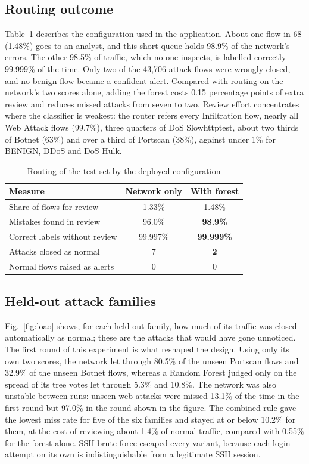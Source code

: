 \documentclass[conference]{IEEEtran}
\begin{document}
\subsection{Routing outcome}
Table~\ref{tab:routing} describes the configuration used in the application. About one flow in 68
(1.48\%) goes to an analyst, and this short queue holds 98.9\% of the network's errors. The other
98.5\% of traffic, which no one inspects, is labelled correctly 99.999\% of the time. Only two of the 43,706
attack flows were wrongly closed, and no benign flow became a confident alert. Compared with
routing on the network's two scores alone, adding the forest costs 0.15 percentage points of extra
review and reduces missed attacks from seven to two. Review effort concentrates where the classifier
is weakest: the router refers every Infiltration flow, nearly all Web Attack flows (99.7\%), three quarters of
DoS Slowhttptest, about two thirds of Botnet (63\%) and over a third of Portscan (38\%), against under 1\% for BENIGN, DDoS and DoS Hulk.

\begin{table}[t]
\caption{Routing of the test set by the deployed configuration}
\label{tab:routing}
\centering
\footnotesize
\begin{tabular}{lcc}
\toprule
Measure & Network only & With forest \\
\midrule
Share of flows for review & 1.33\% & 1.48\% \\
Mistakes found in review & 96.0\% & \textbf{98.9\%} \\
Correct labels without review & 99.997\% & \textbf{99.999\%} \\
Attacks closed as normal & 7 & \textbf{2} \\
Normal flows raised as alerts & 0 & 0 \\
\bottomrule
\end{tabular}
\end{table}

\subsection{Held-out attack families}
\label{sec:loao}
Fig.~\ref{fig:loao} shows, for each held-out family, how much of its traffic was closed automatically as normal;
these are the attacks that would have gone unnoticed. The first round of this experiment
is what reshaped the design. Using only its own two scores, the network let through 80.5\% of the
unseen Portscan flows and 32.9\% of the unseen Botnet flows, whereas a Random Forest judged only on
the spread of its tree votes let through 5.3\% and 10.8\%. The network was also unstable between
runs: unseen web attacks were missed 13.1\% of the time in the first round but 97.0\% in the round
shown in the figure. The combined rule gave the lowest miss rate for five of the six families and
stayed at or below 10.2\% for them, at the cost of reviewing about 1.4\% of normal traffic, compared
with 0.55\% for the forest alone. SSH brute force escaped every variant, because each login attempt
on its own is indistinguishable from a legitimate SSH session.
\end{document}
